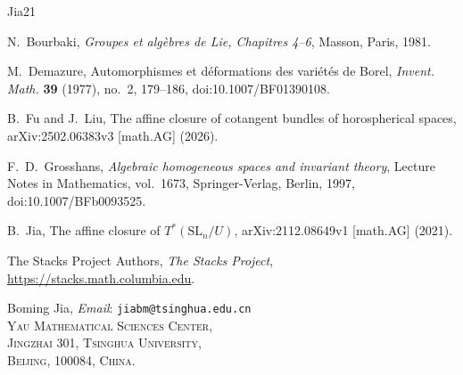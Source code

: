 \documentclass[12pt]{article}
\theoremstyle{definition}
\newcommand{\SL}{\mathrm{SL}}
\begin{document}
{\small
\begin{thebibliography}{Jia21}
\setlength{\itemsep}{0pt}
\setlength{\parsep}{0pt}

N.~Bourbaki, \emph{Groupes et alg\`ebres de Lie, Chapitres 4--6}, Masson, Paris, 1981.

M.~Demazure, Automorphismes et d\'eformations des vari\'et\'es de Borel, \emph{Invent. Math.} \textbf{39} (1977), no.~2, 179--186, doi:10.1007/BF01390108.

B.~Fu and J.~Liu, The affine closure of cotangent bundles of horospherical spaces, arXiv:2502.06383v3 [math.AG] (2026).

F.~D.~Grosshans, \emph{Algebraic homogeneous spaces and invariant theory}, Lecture Notes in Mathematics, vol.~1673, Springer-Verlag, Berlin, 1997, doi:10.1007/BFb0093525.

B.~Jia, The affine closure of $T^*(\SL_n/U)$, arXiv:2112.08649v1 [math.AG] (2021).

The Stacks Project Authors, \emph{The Stacks Project},
\url{https://stacks.math.columbia.edu}.

\end{thebibliography}
}

\medskip
\footnotesize
\noindent Boming Jia, \textit{Email}: \texttt{jiabm@tsinghua.edu.cn}\\
\textsc{Yau Mathematical Sciences Center,\\
Jingzhai 301, Tsinghua University,\\
Beijing, 100084, China.}
\end{document}
